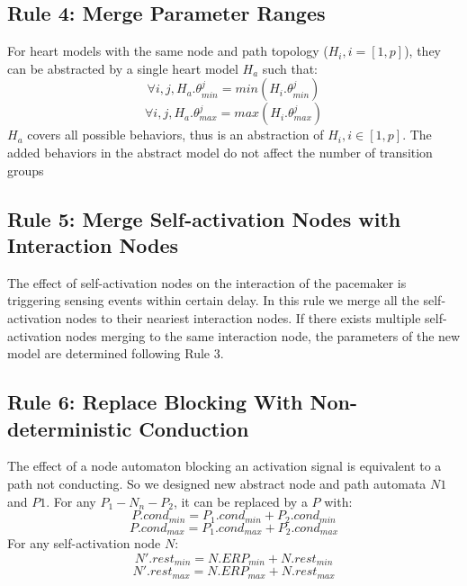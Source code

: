 \subsection{Rule 4: Merge Parameter Ranges}
For heart models with the same node and path topology ($H_i,i=[1,p]$), they can be abstracted by a single heart model $H_a$ such that:
$$\forall i,j,H_a.\theta^j_{min}=min(H_i.\theta^j_{min})$$ 
$$\forall i,j,H_a.\theta^j_{max}=max(H_i.\theta^j_{max})$$ 
$H_a$ covers all possible behaviors, thus is an abstraction of $H_i, i\in [1,p]$. The added behaviors in the abstract model do not affect the number of transition groups
%
%
%

\subsection{Rule 5: Merge Self-activation Nodes with Interaction Nodes}
The effect of self-activation nodes on the interaction of the pacemaker is triggering sensing events within certain delay. In this rule we merge all the self-activation nodes to their neariest interaction nodes. If there exists multiple self-activation nodes merging to the same interaction node, the parameters of the new model are determined following Rule 3.

\subsection{Rule 6: Replace Blocking With Non-deterministic Conduction}
The effect of a node automaton blocking an activation signal is equivalent to a path not conducting. So we designed new abstract node and path automata $N1$ and $P1$. For any $P_1-N_n-P_2$, it can be replaced by a $P$ with:
$$P.cond_{min}=P_1.cond_{min}+P_2.cond_{min}$$
$$P.cond_{max}=P_1.cond_{max}+P_2.cond_{max}$$
For any self-activation node $N$:
$$N'.rest_{min}=N.ERP_{min}+N.rest_{min}$$
$$N'.rest_{max}=N.ERP_{max}+N.rest_{max}$$

